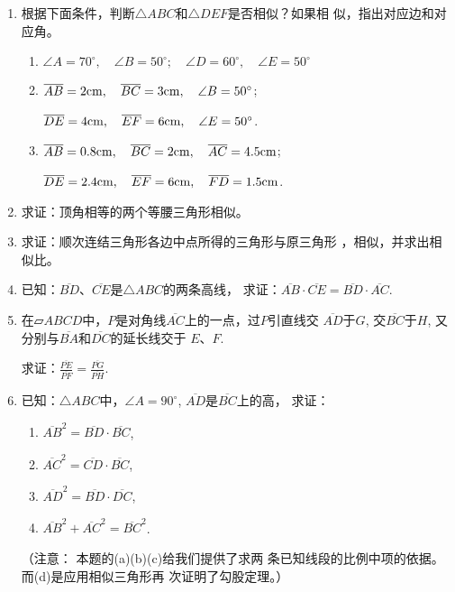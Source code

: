 \begin{ex}
\begin{enumerate}
    \item 根据下面条件，判断$\triangle ABC$和$\triangle DEF$是否相似？如果相
    似，指出对应边和对应角。
\begin{enumerate}
    \item $\angle A=70^{\circ},\quad \angle B=50^{\circ};\quad \angle D=60^{\circ},\quad \angle E=50^{\circ}$
    \item $\overline{AB}=2{\rm cm},\quad \overline{BC}=3{\rm cm},\quad \angle B=50^{\circ}$; 
    
    $\overline{DE}=4{\rm cm},\quad \overline{EF}=6{\rm cm},\quad \angle E=50^{\circ}$.
    \item $\overline{AB}=0.8{\rm cm},\quad \overline{BC}=2{\rm cm},\quad \overline{AC}=4.5{\rm cm}$; 
    
    $\overline{DE}=2.4{\rm cm},\quad \overline{EF}=6{\rm cm},\quad \overline{FD}=1.5{\rm cm}$.
\end{enumerate}

    \item 求证：顶角相等的两个等腰三角形相似。
    \item 求证：顺次连结三角形各边中点所得的三角形与原三角形
    ，相似，并求出相似比。
    \item 已知：$\overline{BD}$、$\overline{CE}$是$\triangle ABC$的两条高线，
    求证：$\overline{AB}\cdot \overline{CE}=\overline{BD}\cdot \overline{AC}$.

\item 在$\parallelogram{ABCD}$中，$P$是对角线$\overline{AC}$上的一点，过$P$引直线交
$\overline{AD}$于$G$, 交$\overline{BC}$于$H$, 又分别与$\overline{BA}$和$\overline{DC}$的延长线交于
$E$、$F$.

求证：$\frac{\overline{PE}}{\overline{PF}}=\frac{\overline{PG}}{\overline{PH}}$.

\item 已知：$\triangle ABC$中，$\angle A=90^{\circ}$, $\overline{AD}$是$\overline{BC}$上的高，
求证：
\begin{multicols}{2}
\begin{enumerate}
    \item $\overline{AB}^2=\overline{BD}\cdot \overline{BC}$,  
    \item $\overline{AC}^2=\overline{CD}\cdot \overline{BC}$, 
    \item $\overline{AD}^2=\overline{BD}\cdot \overline{DC}$, 
    \item $\overline{AB}^2+\overline{AC}^2=\overline{BC}^2$.
\end{enumerate}
\end{multicols}
（注意： 本题的(a)(b)(c)给我们提供了求两
条已知线段的比例中项的依据。而(d)是应用相似三角形再
次证明了勾股定理。）
\end{enumerate}
\end{ex}

